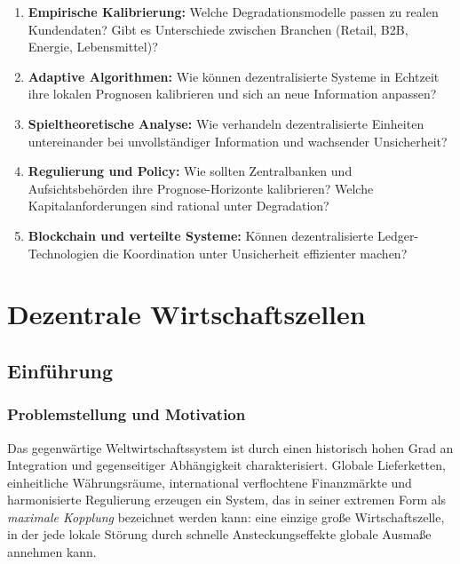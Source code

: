 \documentclass[a4paper, 12pt, twoside, openright]{report}
\theoremstyle{definition}
\theoremstyle{definition}
\begin{document}
\begin{enumerate}
  \item \textbf{Empirische Kalibrierung:} Welche Degradationsmodelle passen zu realen Kundendaten? Gibt es Unterschiede zwischen Branchen (Retail, B2B, Energie, Lebensmittel)?
  
  \item \textbf{Adaptive Algorithmen:} Wie können dezentralisierte Systeme in Echtzeit ihre lokalen Prognosen kalibrieren und sich an neue Information anpassen?
  
  \item \textbf{Spieltheoretische Analyse:} Wie verhandeln dezentralisierte Einheiten untereinander bei unvollständiger Information und wachsender Unsicherheit?
  
  \item \textbf{Regulierung und Policy:} Wie sollten Zentralbanken und Aufsichtsbehörden ihre Prognose-Horizonte kalibrieren? Welche Kapitalanforderungen sind rational unter Degradation?
  
  \item \textbf{Blockchain und verteilte Systeme:} Können dezentralisierte Ledger-Technologien die Koordination unter Unsicherheit effizienter machen?
\end{enumerate}

\cleardoublepage


\chapter{Dezentrale Wirtschaftszellen}
\label{ch:decentralized-cells}

\section{Einführung}

\subsection{Problemstellung und Motivation}

Das gegenwärtige Weltwirtschaftssystem ist durch einen historisch hohen Grad an Integration und
gegenseitiger Abhängigkeit charakterisiert. Globale Lieferketten, einheitliche Währungsräume,
international verflochtene Finanzmärkte und harmonisierte Regulierung erzeugen ein System, das in
seiner extremen Form als \emph{maximale Kopplung} bezeichnet werden kann: eine einzige große
Wirtschaftszelle, in der jede lokale Störung durch schnelle Ansteckungseffekte globale Ausmaße
annehmen kann.
\end{document}
